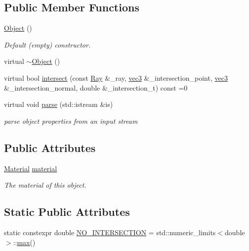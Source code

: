 \subsection*{Public Member Functions}
\begin{DoxyCompactItemize}
\item 
\hyperlink{structObject_a40860402e64d8008fb42329df7097cdb}{Object} ()
\begin{DoxyCompactList}\small\item\em Default (empty) constructor. \end{DoxyCompactList}\item 
virtual \hyperlink{structObject_aa3e791419d84c4c346ef9499513b8e00}{$\sim$\+Object} ()
\item 
virtual bool \hyperlink{structObject_ac6549d30793a9b3da070234bf10c7e91}{intersect} (const \hyperlink{classRay}{Ray} \&\+\_\+ray, \hyperlink{classvec3}{vec3} \&\+\_\+intersection\+\_\+point, \hyperlink{classvec3}{vec3} \&\+\_\+intersection\+\_\+normal, double \&\+\_\+intersection\+\_\+t) const =0
\item 
virtual void \hyperlink{structObject_ae7828b080c96e2226f3dc19823161d41}{parse} (std\+::istream \&is)
\begin{DoxyCompactList}\small\item\em parse object properties from an input stream \end{DoxyCompactList}\end{DoxyCompactItemize}
\subsection*{Public Attributes}
\begin{DoxyCompactItemize}
\item 
\hyperlink{structMaterial}{Material} \hyperlink{structObject_a2f63d05a9a9264e1b6c388fa4bba4e91}{material}
\begin{DoxyCompactList}\small\item\em The material of this object. \end{DoxyCompactList}\end{DoxyCompactItemize}
\subsection*{Static Public Attributes}
\begin{DoxyCompactItemize}
\item 
static constexpr double \hyperlink{structObject_a68971b3c931312e76077de7f8597a6d4}{N\+O\+\_\+\+I\+N\+T\+E\+R\+S\+E\+C\+T\+I\+ON} = std\+::numeric\+\_\+limits$<$double$>$\+::\hyperlink{vec3_8h_a88bf317d8d46ef981cc71e72eb77b184}{max}()
\end{DoxyCompactItemize}


